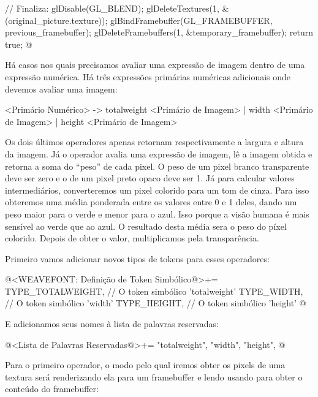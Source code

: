 {{{{{{{  // Finaliza:
  glDisable(GL_BLEND);
  glDeleteTextures(1, &(original_picture.texture));
  glBindFramebuffer(GL_FRAMEBUFFER, previous_framebuffer);
  glDeleteFramebuffers(1, &temporary_framebuffer);
  return true;
}
@
\fimcodigo


Há casos nos quais precisamos avaliar uma expressão de imagem dentro
de uma expressão numérica. Há três expressões primárias numéricas
adicionais onde devemos avaliar uma imagem:

\alinhaverbatim
<Primário Numérico> -> totalweight <Primário de Imagem> |
                       width <Primário de Imagem> |
                       height <Primário de Imagem>
\alinhanormal

Os dois últimos operadores apenas retornam respectivamente a largura e
altura da imagem. Já o operador  avalia
uma expressão de imagem, lê a imagem obtida e retorna a soma do
``peso'' de cada pixel. O peso de um pixel branco transparente deve
ser zero e o de um pixel preto opaco deve ser 1. Já para calcular
valores intermediários, converteremos um pixel colorido para um tom de
cinza. Para isso obteremos uma média ponderada entre os valores entre
0 e 1 deles, dando um peso maior para o verde e menor para o
azul. Isso porque a visão humana é mais sensível ao verde que ao
azul. O resultado desta média sera o peso do píxel colorido. Depois de
obter o valor, multiplicamos pela transparência.

Primeiro vamos adicionar novos tipos de tokens para esses operadores:

\iniciocodigo
@<WEAVEFONT: Definição de Token Simbólico@>+=
TYPE_TOTALWEIGHT,        // O token simbólico 'totalweight'
TYPE_WIDTH,              // O token simbólico 'width'
TYPE_HEIGHT,             // O token simbólico 'height'
@
\fimcodigo

E adicionamos seus nomes à lista de palavras reservadas:

\iniciocodigo
@<Lista de Palavras Reservadas@>+=
"totalweight", "width", "height",
@
\fimcodigo

Para o primeiro operador, o modo pelo qual iremos obter os pixels de
uma textura será renderizando ela para um framebuffer e lendo
usando  para obter o conteúdo do framebuffer:

}}}}}}
